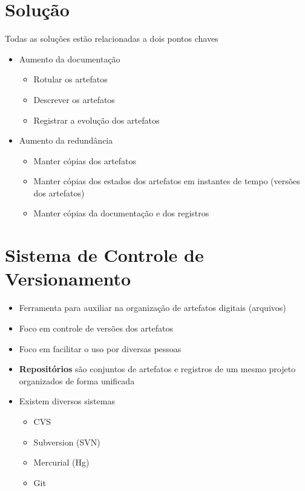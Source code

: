 \documentclass{beamer}
\newenvironment{slide}{\begin{frame}{\insertsection}}{\end{frame}}
\begin{document}
\section{Solução}
\begin{slide}
    Todas as soluções estão relacionadas a dois pontos chaves
    \begin{itemize}
        \pause
        \item Aumento da documentação
        \begin{itemize}
            \pause
            \item Rotular os artefatos
            \pause
            \item Descrever os artefatos
            \pause
            \item Registrar a evolução dos artefatos
        \end{itemize}
        \pause
        \item Aumento da redundância
        \begin{itemize}
            \pause
            \item Manter cópias dos artefatos
            \pause
            \item Manter cópias dos estados dos artefatos em instantes de tempo
                \pause (versões dos artefatos)
            \pause
            \item Manter cópias da documentação e dos registros
        \end{itemize}
    \end{itemize}
\end{slide}

\section{Sistema de Controle de Versionamento}
\begin{slide}
    \begin{itemize}
        \item Ferramenta para auxiliar na organização de artefatos digitais
            \pause (arquivos)
        \pause
        \item Foco em controle de versões dos artefatos
        \pause
        \item Foco em facilitar o uso por diversas pessoas
        \pause
        \item \textbf{Repositórios} são conjuntos de artefatos e registros de um
            mesmo projeto organizados de forma unificada
        \pause
        \item Existem diversos sistemas
        \begin{itemize}
            \pause
            \item CVS
            \pause
            \item Subversion (SVN)
            \pause
            \item Mercurial (Hg)
            \pause
            \item Git
        \end{itemize}
    \end{itemize}
\end{slide}
\end{document}
